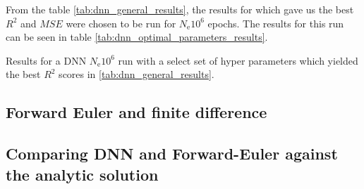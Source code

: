 From the table \ref{tab:dnn_general_results}, the results for which gave us the best $R^2$ and $MSE$ were chosen to be run for $N_\mathrm{e}10^6$ epochs. The results for this run can be seen in table \ref{tab:dnn_optimal_parameters_results}.
\begin{table}[h!tb]
    \centering
    \caption{Results for a DNN $N_\mathrm{e}10^6$ run with a select set of hyper parameters which yielded the best $R^2$ scores in \ref{tab:dnn_general_results}.}
    \label{tab:dnn_optimal_parameters_results}
\end{table}

\subsection{Forward Euler and finite difference}


\subsection{Comparing DNN and Forward-Euler against the analytic solution}
